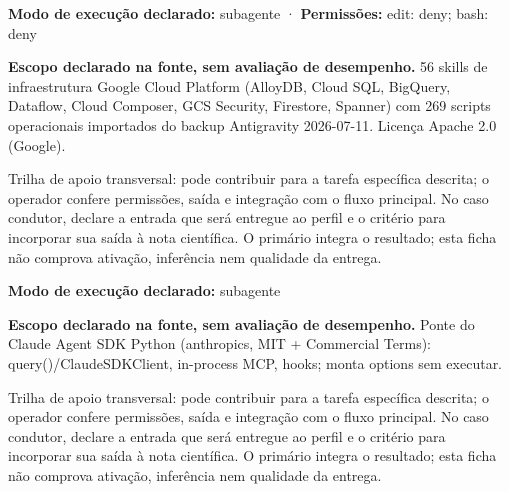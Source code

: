 \begin{arquitetura}
\textbf{Modo de execução declarado:} subagente · \textbf{Permissões:} edit: deny; bash: deny
\end{arquitetura}


\begin{descricao}
\textbf{Escopo declarado na fonte, sem avaliação de desempenho.}
56 skills de infraestrutura Google Cloud Platform (AlloyDB, Cloud SQL, BigQuery, Dataflow, Cloud Composer, GCS Security, Firestore, Spanner) com 269 scripts operacionais importados do backup Antigravity 2026-07-11. Licença Apache 2.0 (Google).
\end{descricao}

\begin{funcao}
Trilha de apoio transversal: pode contribuir para a tarefa específica descrita; o operador confere permissões, saída e integração com o fluxo principal. No caso condutor, declare a entrada que será entregue ao perfil e o critério para incorporar sua saída à nota científica. O primário integra o resultado; esta ficha não comprova ativação, inferência nem qualidade da entrega.
\end{funcao}

\begin{arquitetura}
\textbf{Modo de execução declarado:} subagente
\end{arquitetura}


\begin{descricao}
\textbf{Escopo declarado na fonte, sem avaliação de desempenho.}
Ponte do Claude Agent SDK Python (anthropics, MIT + Commercial Terms): query()/ClaudeSDKClient, in-process MCP, hooks; monta options sem executar.
\end{descricao}

\begin{funcao}
Trilha de apoio transversal: pode contribuir para a tarefa específica descrita; o operador confere permissões, saída e integração com o fluxo principal. No caso condutor, declare a entrada que será entregue ao perfil e o critério para incorporar sua saída à nota científica. O primário integra o resultado; esta ficha não comprova ativação, inferência nem qualidade da entrega.
\end{funcao}

